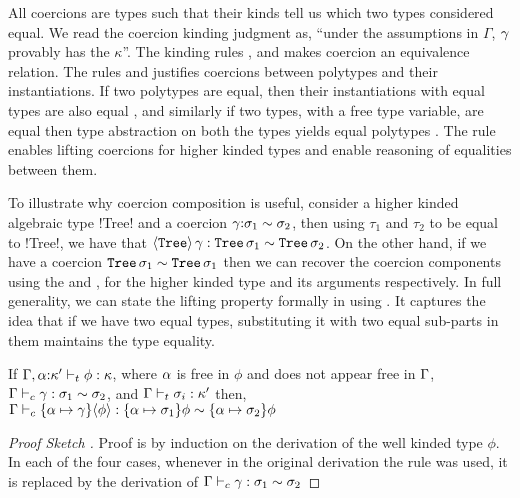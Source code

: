 \documentclass[screen,nonacm,manuscript,review]{acmart} %
\begin{document}
All coercions are types such that their kinds tell us which two types
considered equal. We read the coercion kinding judgment
\fbox{$\CoKinding \Gamma \Co \kappa$} as, ``under the assumptions in
$\Gamma$, $\gamma$ provably has the $\kappa$''. The kinding rules
,  and  makes coercion an
equivalence relation. The rules  and
 justifies coercions between polytypes and their
instantiations. If two polytypes are equal, then their instantiations
with equal types are also equal , and similarly
if two types, with a free type variable, are equal then type
abstraction on both the types yields equal polytypes
. The rule  enables lifting
coercions for higher kinded types and enable reasoning of equalities
between them.

To illustrate why coercion composition is useful, consider a higher
kinded algebraic type !Tree! and a coercion
$\gamma{:}\sigma_1\sim\sigma_2$, then using $\tau_1$ and $\tau_2$ to be
equal to !Tree!, we have that $\langle{\texttt{Tree}}\rangle \,\gamma :
\texttt{Tree}\,\sigma_1 \sim \texttt{Tree}\,\sigma_2$. On the
other hand, if we have a coercion $\texttt{Tree}\,\sigma_1 \sim
\texttt{Tree}\,\sigma_1$ then we can recover the coercion components
using the  and , for the higher kinded
type and its arguments respectively. In full generality, we can state
the lifting property formally in \SFC using
. It captures the idea that
if we have two equal types, substituting it with two equal sub-parts
in them maintains the type equality.

\begin{theorem}\label{thm:sfc-coercion-lifting}
 If $\Gamma,\alpha{:}\kappa' \vdash_{t} \phi : \kappa$, where $\alpha$ is free in $\phi$
 and does not appear free in $\Gamma$,
 $\Gamma \vdash_{c} \gamma : \sigma_1\sim\sigma_2$, and $\Gamma \vdash_{t} \sigma_i : \kappa'$
 then, $\Gamma \vdash_{c} \{\alpha\mapsto \gamma\}\langle{\phi}\rangle : \{\alpha\mapsto\sigma_1\}\phi\sim\{\alpha\mapsto\sigma_2\}\phi$
\end{theorem}
\begin{proof}[Proof Sketch ]
 Proof is by induction on the derivation of the well kinded type
 $\phi$. In each of the four cases, whenever in the original
 derivation the rule  was used, it is replaced by the
 derivation of $\Gamma \vdash_{c} \gamma : \sigma_1\sim\sigma_2$
\end{proof}
\end{document}
